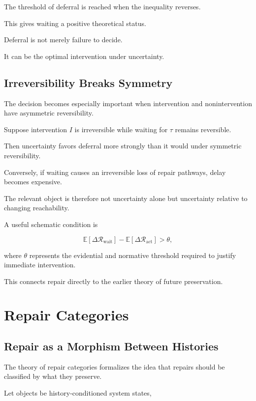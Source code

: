 \documentclass[11pt]{article}
\theoremstyle{remark}
\newcommand{\Reach}{\mathcal{R}}
\begin{document}
The threshold of deferral is reached when the inequality reverses.

This gives waiting a positive theoretical status.

Deferral is not merely failure to decide.

It can be the optimal intervention under uncertainty.

\subsection{Irreversibility Breaks Symmetry}

The decision becomes especially important when intervention and nonintervention have asymmetric reversibility.

Suppose intervention $I$ is irreversible while waiting for $\tau$ remains reversible.

Then uncertainty favors deferral more strongly than it would under symmetric reversibility.

Conversely, if waiting causes an irreversible loss of repair pathways, delay becomes expensive.

The relevant object is therefore not uncertainty alone but uncertainty relative to changing reachability.

A useful schematic condition is

\begin{equation}
\mathbb{E}
\left[
\Delta\Reach_{\mathrm{wait}}
\right]
-
\mathbb{E}
\left[
\Delta\Reach_{\mathrm{act}}
\right]
>
\theta,
\end{equation}

where $\theta$ represents the evidential and normative threshold required to justify immediate intervention.

This connects repair directly to the earlier theory of future preservation.

\section{Repair Categories}

\subsection{Repair as a Morphism Between Histories}

The theory of repair categories formalizes the idea that repairs should be classified by what they preserve.

Let objects be history-conditioned system states,
\end{document}
